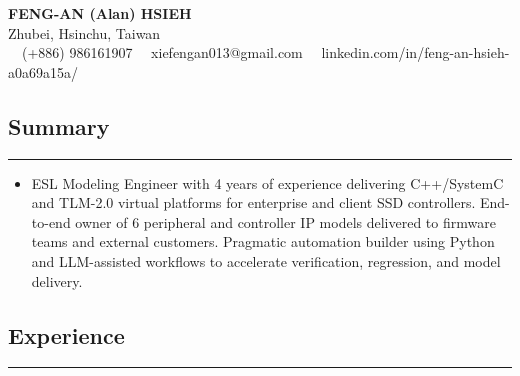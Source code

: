 \documentclass[11pt,a4paper]{article}
\begin{document}
\begin{center}
	{\LARGE \textbf{FENG-AN (Alan) HSIEH}}\\
	Zhubei, Hsinchu, Taiwan
	\vspace{0.05cm}
	\\
	\raisebox{-0.2\height}{\Large \faPhoneSquare} \ \ (+886) 986161907 
    \raisebox{-0.2\height}{\Large \faEnvelopeSquare} \ \ xiefengan013@gmail.com 
    \raisebox{-0.2\height}{\Large \faLinkedinSquare} \ \ linkedin.com/in/feng-an-hsieh-a0a69a15a/
\end{center}

\subsection*{\large Summary}
\hrule
\vspace{0.3em}

\begin{itemize}[leftmargin=1em,noitemsep]
	\item[]
    ESL Modeling Engineer with 4 years of experience delivering C++/SystemC and TLM-2.0 virtual platforms for enterprise and client SSD controllers. End-to-end owner of 6 peripheral and controller IP models delivered to firmware teams and external customers. Pragmatic automation builder using Python and LLM-assisted workflows to accelerate verification, regression, and model delivery.
\end{itemize}

\subsection*{\large Experience}
\hrule
\vspace{0.3em}
\end{document}
